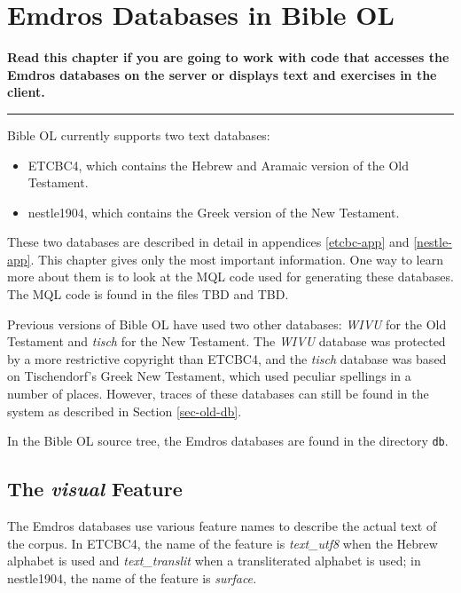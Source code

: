 \documentclass[11pt,oneside,a4paper]{memoir}
\begin{document}
\chapter{Emdros Databases in Bible OL}

\textbf{Read this chapter if you are going to work with code that accesses the Emdros databases on
  the server or displays text and exercises in the client.}
\plainbreak{3}

Bible OL currently supports two text databases:

\begin{itemize}
\item ETCBC4, which contains the Hebrew and Aramaic version of the Old Testament.
\item nestle1904, which contains the Greek version of the New Testament.
\end{itemize}

These two databases are described in detail in appendices \ref{etcbc-app} and
\ref{nestle-app}. This chapter gives only the most important information.
One way to learn more about them is to look at the MQL code used for generating these databases. The
MQL code is found in the files TBD and TBD.

Previous versions of Bible OL have used two other databases: \emph{WIVU} for the Old Testament and
\emph{tisch} for the New Testament. The \emph{WIVU} database was protected by a more restrictive
copyright than ETCBC4, and the \emph{tisch} database was based on Tischendorf's Greek New Testament,
which used peculiar spellings in a number of places. However, traces of these databases can still be
found in the system as described in Section \ref{sec-old-db}.

In the Bible OL source tree, the Emdros databases are found in the directory \texttt{db}.


\section{The \emph{visual} Feature}

The Emdros databases use various feature names to describe the actual text of the corpus. In ETCBC4,
the name of the feature is \emph{text\_utf8} when the Hebrew alphabet is used and
\emph{text\_translit} when a transliterated alphabet is used; in nestle1904, the name of the feature
is \emph{surface.}
\end{document}
